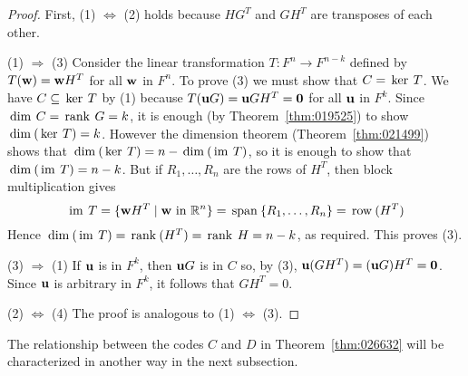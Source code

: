 \begin{proof}
First, (1) $\Leftrightarrow$ (2) holds because $HG^{T}$ and $GH^{T}$ are transposes of each other.

(1) $\Rightarrow$ (3) Consider the linear transformation $T : F^{n} \to F^{n-k}$ defined by $T(\textbf{w}) = \textbf{w}H^{T}$ for all $\textbf{w}$ in $F^{n}$. To prove (3) we must show that $C = \thinspace\operatorname{ker\medspace} T$. We have $C \subseteq \thinspace\operatorname{ker\medspace} T$ by (1) because $T(\textbf{u}G) = \textbf{u}GH^{T} = \textbf{0}$ for all $\textbf{u}$ in $F^{k}$. Since $\thinspace\operatorname{dim\medspace} C = \thinspace\operatorname{rank\medspace} G = k$, it is enough (by Theorem~\ref{thm:019525}) to show $\thinspace\operatorname{dim\medspace}(\thinspace\operatorname{ker\medspace} T) = k$. However the dimension theorem (Theorem~\ref{thm:021499}) shows that $\thinspace\operatorname{dim\medspace}(\thinspace\operatorname{ker\medspace} T) = n - \thinspace\operatorname{dim\medspace}(\thinspace\operatorname{im\medspace} T)$, so it is enough to show that $\thinspace\operatorname{dim\medspace}(\thinspace\operatorname{im\medspace} T) = n - k$. But if $R_{1}, \dots, R_{n}$ are the rows of $H^{T}$, then block multiplication gives
\begin{equation*}
\thinspace\operatorname{im\medspace} T = \{ \textbf{w}H^T \mid \textbf{w} \mbox{ in } \mathbb{R}^n \} = \thinspace\operatorname{span\medspace}\{R_{1}, \dots, R_{n} \} = \thinspace\operatorname{row\medspace}(H^T)
\end{equation*}
Hence $\thinspace\operatorname{dim\medspace}(\thinspace\operatorname{im\medspace} T) = \thinspace\operatorname{rank\medspace} (H^{T}) = \thinspace\operatorname{rank\medspace} H = n - k$, as required. This proves (3).

(3) $\Rightarrow$ (1) If $\textbf{u}$ is in $F^{k}$, then $\textbf{u}G$ is in $C$ so, by (3), $\textbf{u}(GH^{T}) = (\textbf{u}G)H^{T} = \textbf{0}$. Since $\textbf{u}$ is arbitrary in $F^{k}$, it follows that $GH^{T} = 0$.

(2) $\Leftrightarrow$ (4) The proof is analogous to (1) $\Leftrightarrow$ (3).
\end{proof}

\noindent The relationship between the codes $C$ and $D$ in Theorem~\ref{thm:026632} will be characterized in another way in the next subsection.

